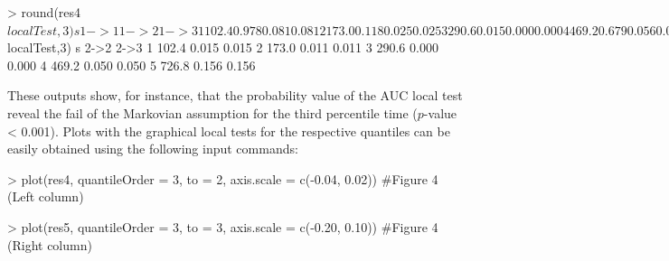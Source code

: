 \begin{example}
> round(res4$localTest,3)
      s    1->1   1->2   1->3
1  102.4  0.978  0.081  0.081
2  173.0  0.118  0.025  0.025
3  290.6  0.015  0.000  0.000
4  469.2  0.679  0.056  0.056
5  726.8  0.635  0.176  0.176

> round(res5$localTest,3)
    s     2->2   2->3
1 102.4   0.015  0.015
2 173.0   0.011  0.011
3 290.6   0.000  0.000
4 469.2   0.050  0.050
5 726.8   0.156  0.156
\end{example}


These outputs show, for instance, that the probability value of the AUC local test reveal the fail of the Markovian assumption for the third percentile time ($p$-value < 0.001). Plots with the graphical local tests for the respective quantiles can be easily obtained using the following input commands:

\begin{example}
> plot(res4, quantileOrder = 3, to = 2, axis.scale = c(-0.04, 0.02))
  #Figure 4 (Left column)

> plot(res5, quantileOrder = 3, to = 3, axis.scale = c(-0.20, 0.10))
  #Figure 4 (Right column)
\end{example}

